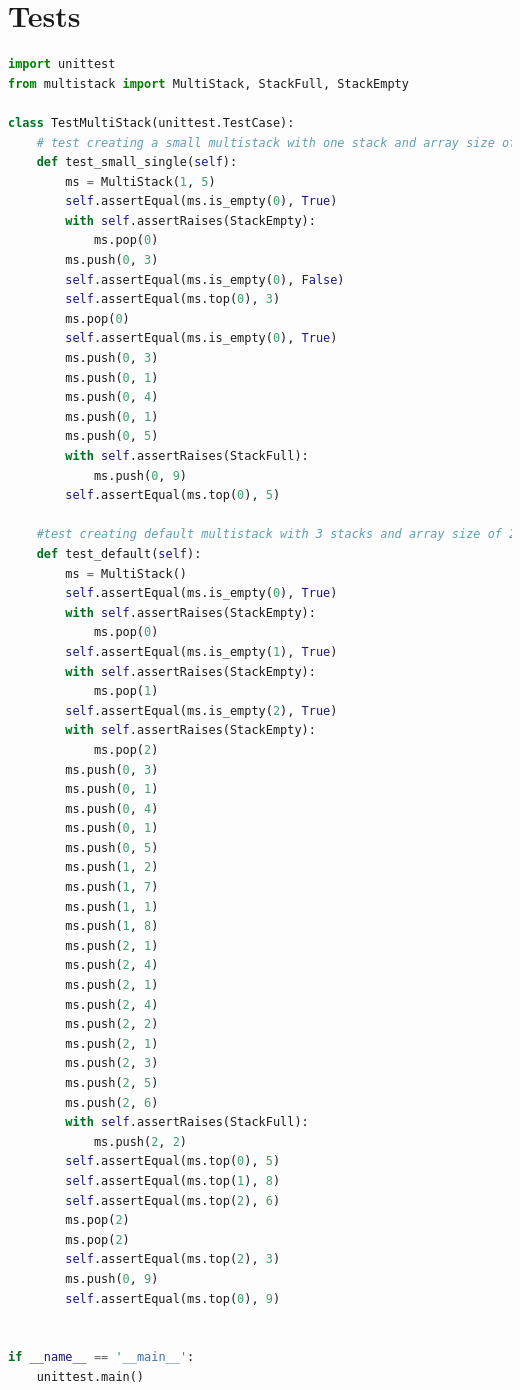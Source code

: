 \documentclass[12pt]{report}
\begin{document}
\chapter{Tests}
\begin{lstlisting}[language=Python, caption=multistack\_tests.py]
import unittest
from multistack import MultiStack, StackFull, StackEmpty

class TestMultiStack(unittest.TestCase):
    # test creating a small multistack with one stack and array size of 5
    def test_small_single(self):
        ms = MultiStack(1, 5)
        self.assertEqual(ms.is_empty(0), True)
        with self.assertRaises(StackEmpty):
            ms.pop(0)
        ms.push(0, 3)
        self.assertEqual(ms.is_empty(0), False)
        self.assertEqual(ms.top(0), 3)
        ms.pop(0)
        self.assertEqual(ms.is_empty(0), True)
        ms.push(0, 3)
        ms.push(0, 1)
        ms.push(0, 4)
        ms.push(0, 1)
        ms.push(0, 5)
        with self.assertRaises(StackFull):
            ms.push(0, 9)
        self.assertEqual(ms.top(0), 5)
    
    #test creating default multistack with 3 stacks and array size of 20
    def test_default(self):
        ms = MultiStack()
        self.assertEqual(ms.is_empty(0), True)
        with self.assertRaises(StackEmpty):
            ms.pop(0)
        self.assertEqual(ms.is_empty(1), True)
        with self.assertRaises(StackEmpty):
            ms.pop(1)
        self.assertEqual(ms.is_empty(2), True)
        with self.assertRaises(StackEmpty):
            ms.pop(2)
        ms.push(0, 3)
        ms.push(0, 1)
        ms.push(0, 4)
        ms.push(0, 1)
        ms.push(0, 5)
        ms.push(1, 2)
        ms.push(1, 7)
        ms.push(1, 1)
        ms.push(1, 8)
        ms.push(2, 1)
        ms.push(2, 4)
        ms.push(2, 1)
        ms.push(2, 4)
        ms.push(2, 2)
        ms.push(2, 1)
        ms.push(2, 3)
        ms.push(2, 5)
        ms.push(2, 6)
        with self.assertRaises(StackFull):
            ms.push(2, 2)
        self.assertEqual(ms.top(0), 5)
        self.assertEqual(ms.top(1), 8)
        self.assertEqual(ms.top(2), 6)
        ms.pop(2)
        ms.pop(2)
        self.assertEqual(ms.top(2), 3)
        ms.push(0, 9)
        self.assertEqual(ms.top(0), 9)


if __name__ == '__main__':
    unittest.main()
\end{lstlisting}
\end{document}

